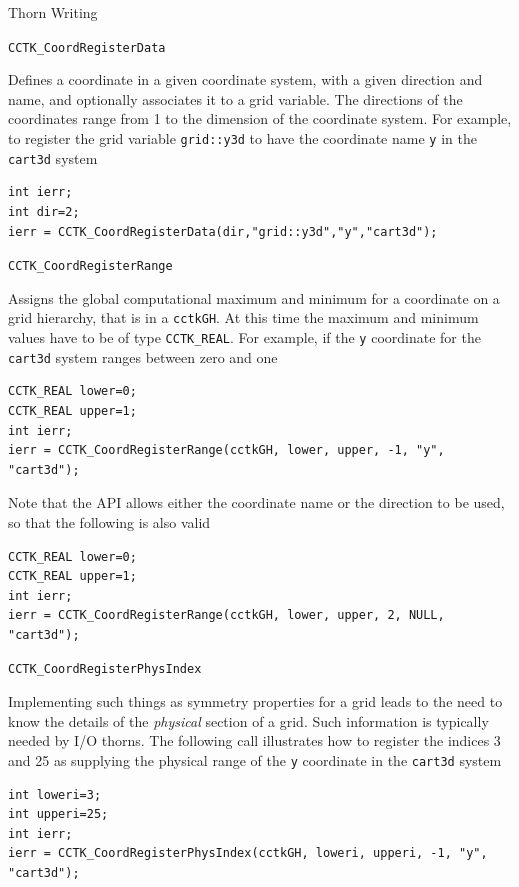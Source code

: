 \begin{cactuspart}{Thorn Writing}
\begin{Lentry}
\item[\texttt{CCTK\_CoordRegisterData}]

Defines a coordinate in a given coordinate system, with a given
        direction and name, and optionally associates it to a grid variable.
The directions of the coordinates range from 1 to the dimension of the
coordinate system. For example, to register the grid variable \texttt{grid::y3d}
to have the coordinate name \texttt{y} in the \texttt{cart3d} system
%
\begin{verbatim}
int ierr;
int dir=2;
ierr = CCTK_CoordRegisterData(dir,"grid::y3d","y","cart3d");
\end{verbatim}

\item[\texttt{CCTK\_CoordRegisterRange}]

Assigns the global computational maximum and minimum for a coordinate
on a grid hierarchy, that is in a \texttt{cctkGH}. At this time the
maximum and minimum values have to be of type \texttt{CCTK\_REAL}. For
example, if the \texttt{y} coordinate for the \texttt{cart3d} system ranges
between zero and one
%
\begin{verbatim}
CCTK_REAL lower=0;
CCTK_REAL upper=1;
int ierr;
ierr = CCTK_CoordRegisterRange(cctkGH, lower, upper, -1, "y", "cart3d");
\end{verbatim}
%
Note that the API allows either the coordinate name or the direction to
be used, so that the following is also valid
%
\begin{verbatim}
CCTK_REAL lower=0;
CCTK_REAL upper=1;
int ierr;
ierr = CCTK_CoordRegisterRange(cctkGH, lower, upper, 2, NULL, "cart3d");
\end{verbatim}

\item[\texttt{CCTK\_CoordRegisterPhysIndex}]

Implementing such things as symmetry properties for a grid leads to
the need to know the details of the \emph{physical} section of a grid.
Such information is typically needed by I/O thorns. The following call
illustrates how to register the
indices 3 and 25 as supplying the physical range of the \texttt{y}
coordinate in the \texttt{cart3d} system
%
\begin{verbatim}
int loweri=3;
int upperi=25;
int ierr;
ierr = CCTK_CoordRegisterPhysIndex(cctkGH, loweri, upperi, -1, "y", "cart3d");
\end{verbatim}



\end{Lentry}


\end{cactuspart}
